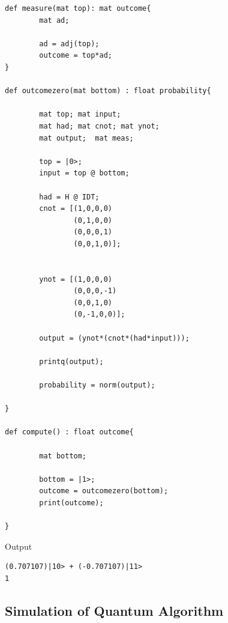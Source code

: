 \begin{lstlisting}
def measure(mat top): mat outcome{
        mat ad;
        
        ad = adj(top);
        outcome = top*ad;
}

def outcomezero(mat bottom) : float probability{
        
        mat top; mat input;
        mat had; mat cnot; mat ynot;
        mat output;  mat meas;
        
        top = |0>;
        input = top @ bottom;
        
        had = H @ IDT;
        cnot = [(1,0,0,0)
                (0,1,0,0)
                (0,0,0,1)
                (0,0,1,0)];
      
        
        ynot = [(1,0,0,0)
                (0,0,0,-1)
                (0,0,1,0)
                (0,-1,0,0)];
    
        output = (ynot*(cnot*(had*input)));
        
        printq(output);
        
        probability = norm(output);
   
}

def compute() : float outcome{
        
        mat bottom;
        
        bottom = |1>;
        outcome = outcomezero(bottom);
        print(outcome);
	
}
\end{lstlisting}
Output
\begin{lstlisting}
(0.707107)|10> + (-0.707107)|11>
1
\end{lstlisting}
\subsection{ Simulation of Quantum Algorithm}

